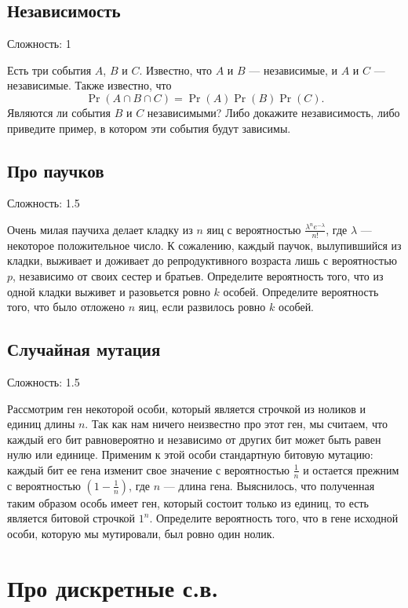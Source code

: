 \documentclass[12pt]{article}
\begin{document}
\subsection{Независимость}

Сложность: 1

Есть три события $A$, $B$ и $C$. Известно, что $A$ и $B$ --- независимые, и $A$ и $C$ --- независимые. Также известно, что \[\Pr(A \cap B \cap C) = \Pr(A)\Pr(B)\Pr(C).\] Являются ли события $B$ и $C$ независимыми? Либо докажите независимость, либо приведите пример, в котором эти события будут зависимы.

\subsection{Про паучков}

Сложность: 1.5

Очень милая паучиха делает кладку из $n$ яиц с вероятностью $\frac{\lambda^n e^{-\lambda}}{n!}$, где $\lambda$ --- некоторое положительное число. К сожалению, каждый паучок, вылупившийся из кладки, выживает и доживает до репродуктивного возраста лишь с вероятностью $p$, независимо от своих сестер и братьев. Определите вероятность того, что из одной кладки выживет и разовьется ровно $k$ особей. Определите вероятность того, что было отложено $n$ яиц, если развилось ровно $k$ особей. 

\subsection{Случайная мутация}

Сложность: 1.5

Рассмотрим ген некоторой особи, который является строчкой из ноликов и единиц длины $n$. Так как нам ничего неизвестно про этот ген, мы считаем, что каждый его бит равновероятно и независимо от других бит может быть равен нулю или единице. Применим к этой особи стандартную битовую мутацию: каждый бит ее гена изменит свое значение с вероятностью $\frac{1}{n}$ и остается прежним с вероятностью $(1 - \frac{1}{n})$, где $n$ --- длина гена. Выяснилось, что полученная таким образом особь имеет ген, который состоит только из единиц, то есть является битовой строчкой $1^n$. Определите вероятность того, что в гене исходной особи, которую мы мутировали, был ровно один нолик.

\section{Про дискретные с.в.}
\end{document}
